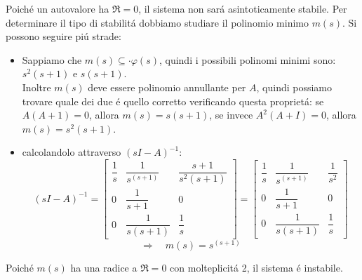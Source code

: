 \begin{Exercise}[title={Studio completo del sistema e stabilizzazione}, difficulty=3]
			Poich\'e un autovalore ha $ \Re = 0 $, il sistema non sar\'a asintoticamente stabile. Per determinare il tipo di stabilit\'a dobbiamo studiare il polinomio minimo $ m(s) $. Si possono seguire pi\'u strade:
			\begin{itemize}
				\item
					Sappiamo che $ m(s) \subseteq\cdot \varphi(s) $, quindi i possibili polinomi minimi sono: $ s^2(s+1) $ e $ s(s+1) $.\\ Inoltre $ m(s) $ deve essere polinomio annullante per $ A $, quindi possiamo trovare quale dei due \'e quello corretto verificando questa propriet\'a: se $ A(A+1) = 0 $, allora $ m(s) = s(s+1) $, se invece $ A^2(A+I) = 0 $, allora $ m(s) = s^2(s+1) $.
				\item
					calcolandolo attraverso $ (sI-A)^{-1} $:
					\[
						(sI-A)^{-1}=
						\begin{bmatrix}
							\dfrac{1}{s} & \dfrac{1}{s^(s+1)} & \dfrac{s+1}{s^2(s+1)}\\[.5cm]
							0 & \dfrac{1}{s+1} & 0\\[.5cm]
							0 & \dfrac{1}{s(s+1)} & \dfrac{1}{s}
						\end{bmatrix} =
						\begin{bmatrix}
							\dfrac{1}{s} & \dfrac{1}{s^(s+1)} & \dfrac{1}{s^2}\\[.5cm]
							0 & \dfrac{1}{s+1} & 0\\[.5cm]
							0 & \dfrac{1}{s(s+1)} & \dfrac{1}{s}
						\end{bmatrix}
					\]
					\[ \Rightarrow\quad m(s) = s^(s+1) \]
			\end{itemize}
			Poich\'e $ m(s) $ ha una radice a $ \Re = 0 $ con molteplicit\'a 2, il sistema \'e instabile.
			

\end{Exercise}
